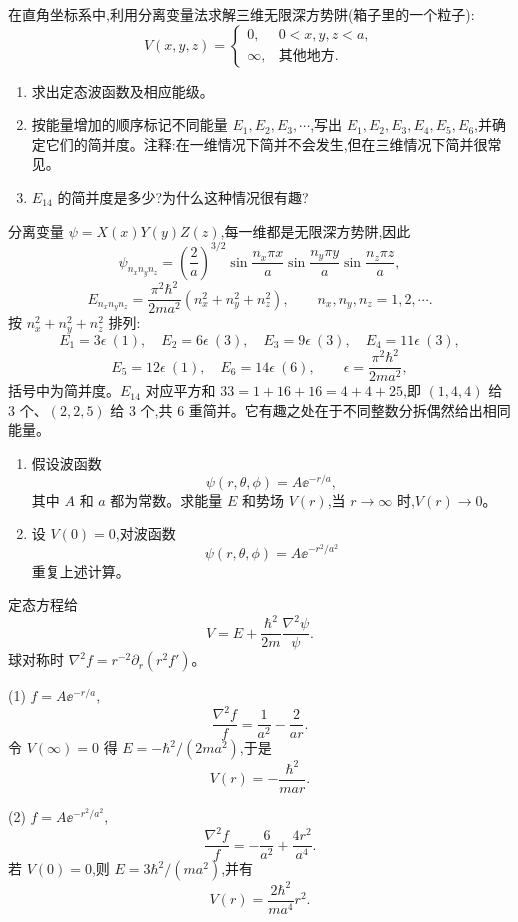 \begin{question}
在直角坐标系中,利用分离变量法求解三维无限深方势阱(箱子里的一个粒子):
\[
V(x,y,z)=\begin{cases}
0, & 0<x,y,z<a,\\
\infty, & \text{其他地方}.
\end{cases}
\]
\begin{enumerate}
\item 求出定态波函数及相应能级。
\item 按能量增加的顺序标记不同能量 $E_1,E_2,E_3,\cdots$,写出 $E_1,E_2,E_3,E_4,E_5,E_6$,并确定它们的简并度。注释:在一维情况下简并不会发生,但在三维情况下简并很常见。
\item $E_{14}$ 的简并度是多少?为什么这种情况很有趣?
\end{enumerate}
\end{question}
\begin{solution}

分离变量 $\psi=X(x)Y(y)Z(z)$,每一维都是无限深方势阱,因此
\[
\psi_{n_xn_yn_z}=\left(\frac{2}{a}\right)^{3/2}\sin\frac{n_x\pi x}{a}\sin\frac{n_y\pi y}{a}\sin\frac{n_z\pi z}{a},
\]
\[
E_{n_xn_yn_z}=\frac{\pi^2\hbar^2}{2ma^2}(n_x^2+n_y^2+n_z^2),\qquad n_x,n_y,n_z=1,2,\cdots .
\]
按 $n_x^2+n_y^2+n_z^2$ 排列:
\[
E_1=3\epsilon\ (1),\quad E_2=6\epsilon\ (3),\quad E_3=9\epsilon\ (3),\quad E_4=11\epsilon\ (3),
\]
\[
E_5=12\epsilon\ (1),\quad E_6=14\epsilon\ (6),\qquad \epsilon=\frac{\pi^2\hbar^2}{2ma^2},
\]
括号中为简并度。$E_{14}$ 对应平方和 $33=1+16+16=4+4+25$,即 $(1,4,4)$ 给 3 个、$(2,2,5)$ 给 3 个,共 6 重简并。它有趣之处在于不同整数分拆偶然给出相同能量。

\end{solution}

\begin{question}
\begin{enumerate}
\item 假设波函数
\[
\psi(r,\theta,\phi)=A \ee^{-r/a},
\]
其中 $A$ 和 $a$ 都为常数。求能量 $E$ 和势场 $V(r)$,当 $r\to\infty$ 时,$V(r)\to0$。
\item 设 $V(0)=0$,对波函数
\[
\psi(r,\theta,\phi)=A \ee^{-r^2/a^2}
\]
重复上述计算。
\end{enumerate}
\end{question}
\begin{solution}

定态方程给
\[
V=E+\frac{\hbar^2}{2m}\frac{\nabla^2\psi}{\psi}.
\]
球对称时 $\nabla^2 f=r^{-2}\partial_r(r^2f')$。

(1) $f=A\ee^{-r/a}$,
\[
\frac{\nabla^2f}{f}=\frac{1}{a^2}-\frac{2}{ar}.
\]
令 $V(\infty)=0$ 得 $E=-\hbar^2/(2ma^2)$,于是
\[
V(r)=-\frac{\hbar^2}{mar}.
\]

(2) $f=A\ee^{-r^2/a^2}$,
\[
\frac{\nabla^2f}{f}=-\frac{6}{a^2}+\frac{4r^2}{a^4}.
\]
若 $V(0)=0$,则 $E=3\hbar^2/(ma^2)$,并有
\[
V(r)=\frac{2\hbar^2}{ma^4}r^2.
\]

\end{solution}

